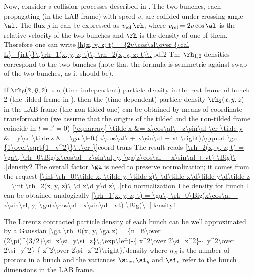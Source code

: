 
Now, consider a collision processes described in . The two bunches, each propagating (in the LAB frame) with speed $v$, are collided under crossing angle $\al$. The flux $j$ in  can be expressed as $v_{\rm rel}\,\rh$, where $v_{\rm rel} = 2v\cos\al$ is the relative velocity of the two bunches and $\rh$ is the density of one of them. Therefore one can write
\eqref{h(x, y, z; t) = {2v\cos\al\over {\cal L}_{int}}\,\rh_1(x, y, z; t)\, \rh_2(x, y, z; t)\.}{pdf2}
The $\rh_{1,2}$ densities correspond to the two bunches (note that the formula is symmetric against swap of the two bunches, as it should be).

If $\rh_0(\tilde x, \tilde y, \tilde z)$ is a (time-independent) particle density in the rest frame of bunch 2 (the tilded frame in ), then the (time-dependent) particle density $\rh_2(x, y, z)$ in the LAB frame (the non-tilded one) can be obtained by means of coordinate transformation (we assume that the origins of the tilded and the non-tilded frame coincide in $t=t'=0$)
\eqref{\eqnarray{
\tilde x &= x\cos\al\ - z\sin\al \cr
\tilde y &= y\cr
\tilde z &= \ga \left( z\cos\al\ + x\sin\al + vt \right),\qquad \ga = {1\over\sqrt{1 - v^2}}\ .\cr
}}{coord trans}
The result reads
\eqref{\rh_2(x, y, z; t) = \ga\, \rh_0\Big(x\cos\al - z\sin\al, y, \ga(z\cos\al + x\sin\al + vt) \Big)\ .}{density2}
The overall factor $\ga$ is need to preserve normalization; it comes from the request
\eqref{\int \rh_0(\tilde x, \tilde y, \tilde z)\ \d\tilde x\d\tilde y\d\tilde z = \int \rh_2(x, y, z)\ \d x\d y\d z\ .}{rho normalization}
The density for bunch 1 can be obtained analogically
\eqref{\rh_1(x, y, z; t) = \ga\, \rh_0\Big(x\cos\al + z\sin\al, y, \ga(z\cos\al - x\sin\al - vt) \Big)\ .}{density1}

The Lorentz contracted particle density of each bunch can be well approximated by a Gaussian
\eqref{\ga \rh_0(x, y, \ga z) = {n_B\over (2\pi)^{3/2}\si_x\si_y\si_z}\,\exp\left(-{ x^2\over 2\si_x^2}-{ y^2\over 2\si_y^2}-{ z^2\over 2\si_z^2}\right),}{density}
where $n_B$ is the number of protons in a bunch and the variances $\si_x, \si_y$ and $\si_z$ refer to the bunch dimensions in the LAB frame.

